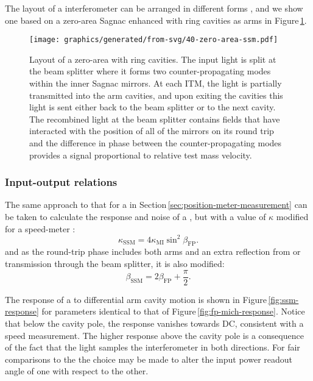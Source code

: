 The layout of a \SSM{} interferometer can be arranged in different forms \cite{Huttner2016}, and we show one based on a zero-area Sagnac enhanced with ring cavities as arms in Figure\,\ref{fig:zero-area-ssm}.

\begin{figure}
  \centering
  \texttt{[image: graphics/generated/from-svg/40-zero-area-ssm.pdf]}
  \caption[Layout of a zero-area \SSM{}]{\label{fig:zero-area-ssm}Layout of a zero-area \SSM{} with ring cavities. The input light is split at the beam splitter where it forms two counter-propagating modes within the inner Sagnac mirrors. At each \gls{ITM}, the light is partially transmitted into the arm cavities, and upon exiting the cavities this light is sent either back to the beam splitter or to the next cavity. The recombined light at the beam splitter contains fields that have interacted with the position of all of the mirrors on its round trip and the difference in phase between the counter-propagating modes provides a signal proportional to relative test mass velocity.}
\end{figure} 

\subsubsection{Input-output relations}
The same approach to that for a \FPMI{} in Section\,\ref{sec:position-meter-measurement} can be taken to calculate the response and noise of a \SM{}, but with a value of $\kappa$ modified for a speed-meter \cite{Chen2003}:
\begin{equation}
  \kappa_{\text{SSM}} = 4 \kappa_{\text{MI}} \sin^2 \beta_{\text{FP}}.
\end{equation}
and as the round-trip phase includes both arms and an extra reflection from or transmission through the beam splitter, it is also modified:
\begin{equation}
  \beta_{\text{SSM}} = 2 \beta_{\text{FP}} + \frac{\pi}{2}.
\end{equation}

The response of a \SSM{} to differential arm cavity motion is shown in Figure\,\ref{fig:ssm-response} for parameters identical to that of Figure\,\ref{fig:fp-mich-response}. Notice that below the cavity pole, the response vanishes towards \gls{DC}, consistent with a speed measurement. The higher response above the cavity pole is a consequence of the fact that the light samples the interferometer in both directions. For fair comparisons to the \MI{} the choice may be made to alter the input power readout angle of one with respect to the other.

